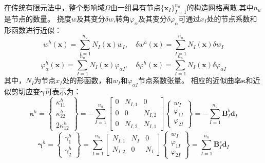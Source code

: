 在传统有限元法中，整个影响域$\Omega$由一组具有节点$\{\boldsymbol x_I\}_{I=1}^{n_u}$的构造网格离散,其中$n_u$是节点的数量。
挠度$w$及其变分$\delta w $,转角$\varphi_\alpha$及其变分$\delta \varphi_\alpha $可通过$x_I$处的节点系数和形函数进行近似：
\begin{equation}
    w^h(\boldsymbol x) = \sum_{I=1}^{n_u} N_I(\boldsymbol x) w_I, \quad \delta w^h(\boldsymbol x) = \sum_{I=1}^{n_u} N_I(\boldsymbol x) \delta w_I
\end{equation}
\begin{equation}
    \varphi^h_{\alpha}(\boldsymbol x) = \sum_{I=1}^{n_u} N_I(\boldsymbol x) \varphi_{\alpha I}, \quad \delta \varphi^h(\boldsymbol x) = \sum_{I=1}^{n_u} N_I(\boldsymbol x) \delta \varphi_{\alpha I}
\end{equation}
其中，$N_I$为节点$x_I$处的形函数，和$w_I$和$\varphi_{\alpha I}$节点系数张量。
相应的近似曲率$\pmb\kappa$和近似剪切应变$\pmb\gamma$可表示为：
\begin{equation}
    \boldsymbol\kappa^h = 
    \begin{Bmatrix}
        \kappa^h_{11} \\ \kappa^h_{22} \\ 2\kappa^h_{12} 
    \end{Bmatrix} = -\sum_{I=1}^{n_u}
    \begin{bmatrix}
        0 & N_{I,1} & 0 \\ 0 & 0 & N_{I,2} \\ 0 & N_{I,2} & N_{I,1}
    \end{bmatrix}
    \begin{Bmatrix}
        w_I \\ \varphi_{1I} \\ \varphi_{2I}
    \end{Bmatrix} = - \sum_{I=1}^{n_u} \boldsymbol B^b_I \boldsymbol d_I
\end{equation}
\begin{equation}
    \boldsymbol\gamma^h = 
    \begin{Bmatrix}
        \gamma^h_1 \\ \gamma^h_2
    \end{Bmatrix} = \sum_{I=1}^{n_u}
    \begin{bmatrix}
        N_{I,1} & N_I & 0 \\
        N_{I,2} & 0 & N_I
    \end{bmatrix}
    \begin{Bmatrix}
        w_I \\ \varphi_{1I} \\ \varphi_{2I}
    \end{Bmatrix} = \sum_{I=1}^{n_u} \boldsymbol B^s_I \boldsymbol d_I
\end{equation}
